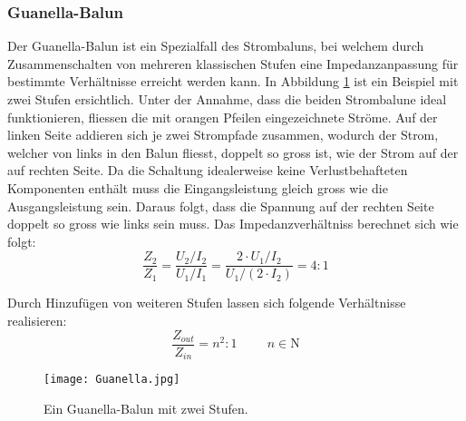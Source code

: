 \newpage
\subsubsection{Guanella-Balun}
Der Guanella-Balun ist ein Spezialfall des Strombaluns, bei welchem durch Zusammenschalten von mehreren klassischen Stufen eine Impedanzanpassung für bestimmte Verhältnisse erreicht werden kann. In Abbildung \ref{fig:Guanella} ist ein Beispiel mit zwei Stufen ersichtlich. Unter der Annahme, dass die beiden Strombalune ideal funktionieren, fliessen die mit orangen Pfeilen eingezeichnete Ströme. Auf der linken Seite addieren sich je zwei Strompfade zusammen, wodurch der Strom, welcher von links in den Balun fliesst, doppelt so gross ist, wie der Strom auf der auf rechten Seite. Da die Schaltung idealerweise keine Verlustbehafteten Komponenten enthält muss die Eingangsleistung gleich gross wie die Ausgangsleistung sein. Daraus folgt, dass die Spannung auf der rechten Seite doppelt so gross wie links sein muss. Das Impedanzverhältniss berechnet sich wie folgt: \cite{balun_work} \cite{sevik} 
\begin{equation}
\frac{Z_2}{Z_1}=\frac{U_2/I_2}{U_1/I_1}=\frac{2\cdot U_1/I_2}{U_1/(2\cdot I_2)}=4:1
\label{equ:Guanella_1}
\end{equation}

Durch Hinzufügen von weiteren Stufen lassen sich folgende Verhältnisse realisieren:
\begin{equation}
	\frac{Z_{out}}{Z_{in}}=n^{2}:1 \hspace{1cm} n\in\mathrm{N}
\end{equation}
\begin{figure}[H]
	\centering
	\texttt{[image: Guanella.jpg]}
	\caption{Ein Guanella-Balun mit zwei Stufen.}\label{fig:Guanella}
\end{figure}